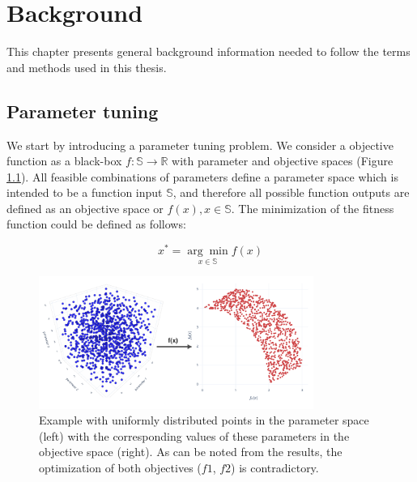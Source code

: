 \chapter{Background}\label{sec:background}

    This chapter presents general background information needed to follow the terms and methods used in this thesis. 

    \section{Parameter tuning}
        We start by introducing a parameter tuning problem. We consider a objective function as a black-box $f : \mathbb{S} \rightarrow \mathbb{R}$ with parameter and objective spaces (Figure \ref{fig:spaces}). All feasible combinations of parameters define a parameter space which is intended to be a function input $\mathbb{S}$, and therefore all possible function outputs are defined as an objective space or $f(x), x \in \mathbb{S}$. The minimization of the fitness function could be defined as follows:

                \begin{equation} \label{eq:arg_min}
                    x^* = \underset{x \in \mathbb{S}}{\arg\min} f(x)
                \end{equation}

        \begin{figure}
            \centering 
            \includegraphics[width=0.8\textwidth]{content/images/utility/spaces}
            \caption[Example with uniformly distributed points in the parameter space (left) with the corresponding values of these parameters in the objective space]{Example with uniformly distributed points in the parameter space (left) with the corresponding values of these parameters in the objective space (right). As can be noted from the results, the optimization of both objectives ($f1$, $f2$) is contradictory.} 
            \label{fig:spaces} 
        \end{figure}

